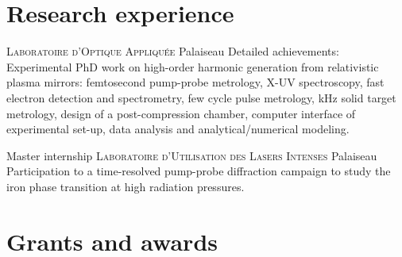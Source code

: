 \documentclass[11pt,a4paper,sans]{moderncv} %
\begin{document}

\section{Research experience}



{%
\textsc{Laboratoire d'Optique Appliquée}}
{%
Palaiseau}
{}
{%
Detailed achievements:
Experimental PhD work on high-order harmonic generation from relativistic plasma mirrors: femtosecond pump-probe metrology, X-UV spectroscopy, fast electron detection and spectrometry, few cycle pulse metrology, kHz solid target metrology, design of a post-compression chamber, computer interface of experimental set-up, data analysis and analytical/numerical modeling. 
}


{Master internship}
{\textsc{Laboratoire d'Utilisation des Lasers Intenses}}
{Palaiseau}
{}
{Participation to a time-resolved pump-probe diffraction campaign to study the iron phase transition at high radiation pressures. }






\section{Grants and awards}

\end{document}
